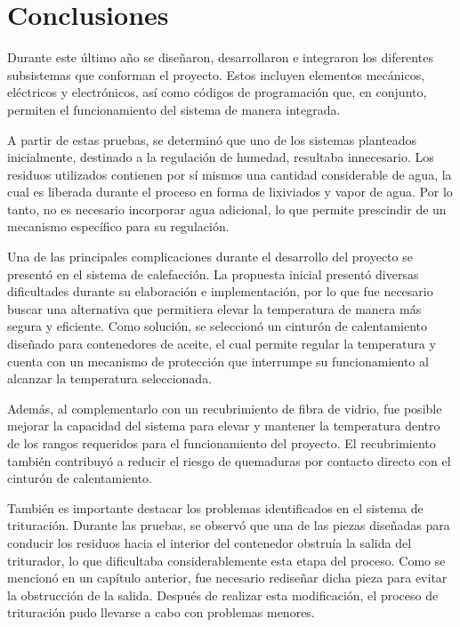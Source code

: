 
\section{Conclusiones}

Durante este último año se diseñaron, desarrollaron e integraron los diferentes subsistemas que conforman el proyecto. Estos incluyen elementos mecánicos, eléctricos y electrónicos, así como códigos de programación que, en conjunto, permiten el funcionamiento del sistema de manera integrada.

A partir de estas pruebas, se determinó que uno de los sistemas planteados inicialmente, destinado a la regulación de humedad, resultaba innecesario. Los residuos utilizados contienen por sí mismos una cantidad considerable de agua, la cual es liberada durante el proceso en forma de lixiviados y vapor de agua. Por lo tanto, no es necesario incorporar agua adicional, lo que permite prescindir de un mecanismo específico para su regulación.

Una de las principales complicaciones durante el desarrollo del proyecto se presentó en el sistema de calefacción. La propuesta inicial presentó diversas dificultades durante su elaboración e implementación, por lo que fue necesario buscar una alternativa que permitiera elevar la temperatura de manera más segura y eficiente. Como solución, se seleccionó un cinturón de calentamiento diseñado para contenedores de aceite, el cual permite regular la temperatura y cuenta con un mecanismo de protección que interrumpe su funcionamiento al alcanzar la temperatura seleccionada.

Además, al complementarlo con un recubrimiento de fibra de vidrio, fue posible mejorar la capacidad del sistema para elevar y mantener la temperatura dentro de los rangos requeridos para el funcionamiento del proyecto. El recubrimiento también contribuyó a reducir el riesgo de quemaduras por contacto directo con el cinturón de calentamiento.

También es importante destacar los problemas identificados en el sistema de trituración. Durante las pruebas, se observó que una de las piezas diseñadas para conducir los residuos hacia el interior del contenedor obstruía la salida del triturador, lo que dificultaba considerablemente esta etapa del proceso. Como se mencionó en un capítulo anterior, fue necesario rediseñar dicha pieza para evitar la obstrucción de la salida. Después de realizar esta modificación, el proceso de trituración pudo llevarse a cabo con problemas menores.

